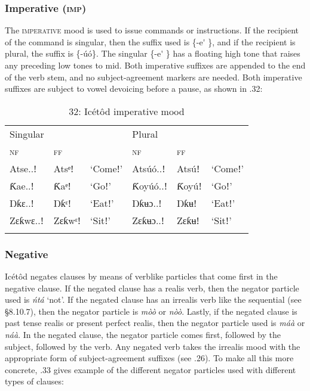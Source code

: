 \subsubsection{Imperative (\textsc{imp})}

The \textsc{imperative} mood is used to issue commands or instructions. If the recipient of the command is singular, then the suffix used is \{-e\'{} \}, and if the recipient is plural, the suffix is \{-úó\}. The singular \{-e\'{} \} has a floating high tone that raises any preceding low tones to mid. Both imperative suffixes are appended to the end of the verb stem, and no subject-agreement markers are needed. Both imperative suffixes are subject to vowel devoicing before a pause, as shown in .32:


\begin{table}
\caption{32: Icétôd imperative mood}
\label{tab:8}


\begin{tabularx}{\textwidth}{XXXXXX}
\lsptoprule

Singular &  &  & Plural &  & \\
\textsc{nf} & \textsc{ff} &  & \textsc{nf} & \textsc{ff} & \\
Atse..ǃ & Atsᵉǃ & ‘Comeǃ’ & Atsúó..ǃ & Atsúǃ & ‘Comeǃ’\\
Ƙae..ǃ & Ƙaᵉǃ & ‘Goǃ’ & Ƙoyúó..ǃ & Ƙoyúǃ & ‘Goǃ’\\
Ŋƙɛ..ǃ & Ŋƙᵋǃ & ‘Eatǃ’ & Ŋƙʉɔ..ǃ & Ŋƙʉǃ & ‘Eatǃ’\\
Zɛƙwɛ..ǃ & Zɛƙwᵋǃ & ‘Sitǃ’ & Zɛƙʉɔ..ǃ & Zɛƙʉǃ & ‘Sitǃ’\\
\lspbottomrule
\end{tabularx}
\end{table}

\subsubsection{Negative}

Icétôd negates clauses by means of verblike particles that come first in the negative clause. If the negated clause has a realis verb, then the negator particle used is \textit{ńtá} ‘not’. If the negated clause has an irrealis verb like the sequential (see §8.10.7), then the negator particle is \textit{mòò} or \textit{nòò}. Lastly, if the negated clause is past tense realis or present perfect realis, then the negator particle used is \textit{máà} or \textit{náà}. In the negated clause, the negator particle comes first, followed by the subject, followed by the verb. Any negated verb takes the irrealis mood with the appropriate form of subject-agreement suffixes (see .26). To make all this more concrete, .33 gives example of the different negator particles used with different types of clauses:


